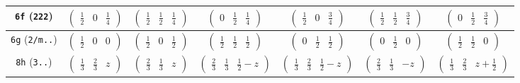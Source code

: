 \documentclass[fleqn,9pt,landscape]{jsarticle}
\begin{document}
\begin{center}
\begin{longtable}{ccccccc}
{\tt 6f} ({\tt 222}) & $ \begin{pmatrix} \frac{1}{2} & 0 & \frac{1}{4} \end{pmatrix} $ & $ \begin{pmatrix} \frac{1}{2} & \frac{1}{2} & \frac{1}{4} \end{pmatrix} $ & $ \begin{pmatrix} 0 & \frac{1}{2} & \frac{1}{4} \end{pmatrix} $ & $ \begin{pmatrix} \frac{1}{2} & 0 & \frac{3}{4} \end{pmatrix} $ & $ \begin{pmatrix} \frac{1}{2} & \frac{1}{2} & \frac{3}{4} \end{pmatrix} $ & $ \begin{pmatrix} 0 & \frac{1}{2} & \frac{3}{4} \end{pmatrix} $ \\ \hline
{\tt 6g} ({\tt 2/m..}) & $ \begin{pmatrix} \frac{1}{2} & 0 & 0 \end{pmatrix} $ & $ \begin{pmatrix} \frac{1}{2} & 0 & \frac{1}{2} \end{pmatrix} $ & $ \begin{pmatrix} \frac{1}{2} & \frac{1}{2} & \frac{1}{2} \end{pmatrix} $ & $ \begin{pmatrix} 0 & \frac{1}{2} & \frac{1}{2} \end{pmatrix} $ & $ \begin{pmatrix} 0 & \frac{1}{2} & 0 \end{pmatrix} $ & $ \begin{pmatrix} \frac{1}{2} & \frac{1}{2} & 0 \end{pmatrix} $ \\ \hline
{\tt 8h} ({\tt 3..}) & $ \begin{pmatrix} \frac{1}{3} & \frac{2}{3} & z \end{pmatrix} $ & $ \begin{pmatrix} \frac{2}{3} & \frac{1}{3} & z \end{pmatrix} $ & $ \begin{pmatrix} \frac{2}{3} & \frac{1}{3} & \frac{1}{2} - z \end{pmatrix} $ & $ \begin{pmatrix} \frac{1}{3} & \frac{2}{3} & \frac{1}{2} - z \end{pmatrix} $ & $ \begin{pmatrix} \frac{2}{3} & \frac{1}{3} & - z \end{pmatrix} $ & $ \begin{pmatrix} \frac{1}{3} & \frac{2}{3} & z + \frac{1}{2} \end{pmatrix} $ \\

\end{longtable}
\end{center}
\end{document}
